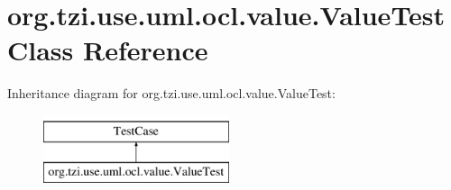\hypertarget{classorg_1_1tzi_1_1use_1_1uml_1_1ocl_1_1value_1_1_value_test}{\section{org.\-tzi.\-use.\-uml.\-ocl.\-value.\-Value\-Test Class Reference}
\label{classorg_1_1tzi_1_1use_1_1uml_1_1ocl_1_1value_1_1_value_test}
}
Inheritance diagram for org.\-tzi.\-use.\-uml.\-ocl.\-value.\-Value\-Test\-:\begin{figure}[H]
\begin{center}
\leavevmode
\includegraphics[height=2.000000cm]{classorg_1_1tzi_1_1use_1_1uml_1_1ocl_1_1value_1_1_value_test}
\end{center}
\end{figure}
